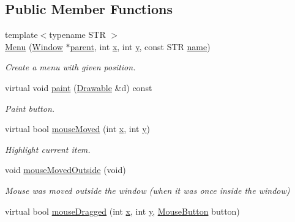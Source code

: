 \subsection*{Public Member Functions}
\begin{DoxyCompactItemize}
\item 
{\footnotesize template$<$typename S\-T\-R $>$ }\\\hyperlink{classGUI_1_1Menu_a3ad4f5a1fbc5aaf57a269a464a42c885}{Menu} (\hyperlink{classGUI_1_1Window}{Window} $\ast$\hyperlink{classGUI_1_1Window_a2e593ff65e7702178d82fe9010a0b539}{parent}, int \hyperlink{classGUI_1_1Window_a6ca6a80ca00c9e1d8ceea8d3d99a657d}{x}, int \hyperlink{classGUI_1_1Window_a0ee8e923aff2c3661fc2e17656d37adf}{y}, const S\-T\-R \hyperlink{classGUI_1_1ActionEventSource_ab494e66ccff6518e1cabe747df2173f8}{name})
\begin{DoxyCompactList}\small\item\em Create a menu with given position. \end{DoxyCompactList}\item 
\hypertarget{classGUI_1_1Menu_a731ee3b42950cc9210c4c017823c8b0c}{virtual void \hyperlink{classGUI_1_1Menu_a731ee3b42950cc9210c4c017823c8b0c}{paint} (\hyperlink{classGUI_1_1Drawable}{Drawable} \&d) const }\label{classGUI_1_1Menu_a731ee3b42950cc9210c4c017823c8b0c}

\begin{DoxyCompactList}\small\item\em Paint button. \end{DoxyCompactList}\item 
\hypertarget{classGUI_1_1Menu_a8c82c2e98eeaf6a9c232551504908ee8}{virtual bool \hyperlink{classGUI_1_1Menu_a8c82c2e98eeaf6a9c232551504908ee8}{mouse\-Moved} (int \hyperlink{classGUI_1_1Window_a6ca6a80ca00c9e1d8ceea8d3d99a657d}{x}, int \hyperlink{classGUI_1_1Window_a0ee8e923aff2c3661fc2e17656d37adf}{y})}\label{classGUI_1_1Menu_a8c82c2e98eeaf6a9c232551504908ee8}

\begin{DoxyCompactList}\small\item\em Highlight current item. \end{DoxyCompactList}\item 
\hypertarget{classGUI_1_1Menu_aa41d8cb7c278d18f880a2879f335a07f}{void \hyperlink{classGUI_1_1Menu_aa41d8cb7c278d18f880a2879f335a07f}{mouse\-Moved\-Outside} (void)}\label{classGUI_1_1Menu_aa41d8cb7c278d18f880a2879f335a07f}

\begin{DoxyCompactList}\small\item\em Mouse was moved outside the window (when it was once inside the window) \end{DoxyCompactList}\item 
\hypertarget{classGUI_1_1Menu_ac625425b56b527467ddbbaa107fa12cb}{virtual bool \hyperlink{classGUI_1_1Menu_ac625425b56b527467ddbbaa107fa12cb}{mouse\-Dragged} (int \hyperlink{classGUI_1_1Window_a6ca6a80ca00c9e1d8ceea8d3d99a657d}{x}, int \hyperlink{classGUI_1_1Window_a0ee8e923aff2c3661fc2e17656d37adf}{y}, \hyperlink{namespaceGUI_ad06082a7b02aa73697f39eb8e0856de9}{Mouse\-Button} button)}\label{classGUI_1_1Menu_ac625425b56b527467ddbbaa107fa12cb}


\end{DoxyCompactItemize}
